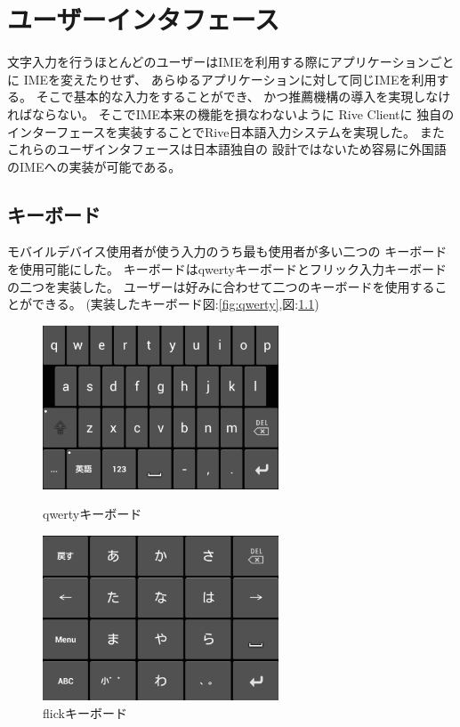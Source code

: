 \chapter{ユーザーインタフェース}
\label{chap:userinterface}
文字入力を行うほとんどのユーザーはIMEを利用する際にアプリケーションごとに
IMEを変えたりせず、
あらゆるアプリケーションに対して同じIMEを利用する。
そこで基本的な入力をすることができ、
かつ推薦機構の導入を実現しなければならない。
そこでIME本来の機能を損なわないように
Rive Clientに
独自のインターフェースを実装することでRive日本語入力システムを実現した。
またこれらのユーザインタフェースは日本語独自の
設計ではないため容易に外国語のIMEへの実装が可能である。

\newpage
\section{キーボード}
モバイルデバイス使用者が使う入力のうち最も使用者が多い二つの
キーボードを使用可能にした。
キーボードはqwertyキーボードとフリック入力キーボードの二つを実装した。
ユーザーは好みに合わせて二つのキーボードを使用することができる。
(実装したキーボード図:\ref{fig:qwerty},図:\ref{fig:flick})
\begin{figure}[htbp]
  \begin{minipage}{0.5\hsize}
    \begin{center}
      \includegraphics[width=7cm,bb=0 0 417 290]{images/qwerty.png}
    \end{center}
    \caption{qwertyキーボード}
    \label{fig:qwerty}
  \end{minipage}
  \begin{minipage}{0.5\hsize}
    \begin{center}
      \includegraphics[width=7cm,bb=0 0 415 290]{images/flick.png}
    \end{center}
    \caption{flickキーボード}
    \label{fig:flick}
  \end{minipage}
\end{figure}

